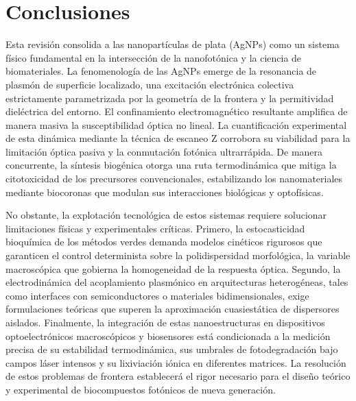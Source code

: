 \section{Conclusiones}

Esta revisión consolida a las nanopartículas de plata (AgNPs) como un sistema
físico fundamental en la intersección de la nanofotónica y la ciencia de
biomateriales. La fenomenología de las AgNPs emerge de la resonancia de
plasmón de superficie localizado, una excitación electrónica colectiva
estrictamente parametrizada por la geometría de la frontera y la permitividad
dieléctrica del entorno. El confinamiento electromagnético resultante amplifica
de manera masiva la susceptibilidad óptica no lineal. La cuantificación
experimental de esta dinámica mediante la técnica de escaneo Z corrobora su
viabilidad para la limitación óptica pasiva y la conmutación fotónica
ultrarrápida. De manera concurrente, la síntesis biogénica otorga una ruta
termodinámica que mitiga la citotoxicidad de los precursores convencionales,
estabilizando los nanomateriales mediante biocoronas que modulan sus
interacciones biológicas y optofísicas.

No obstante, la explotación tecnológica de estos sistemas requiere solucionar
limitaciones físicas y experimentales críticas. Primero, la estocasticidad
bioquímica de los métodos verdes demanda modelos cinéticos rigurosos que
garanticen el control determinista sobre la polidispersidad morfológica, la
variable macroscópica que gobierna la homogeneidad de la respuesta óptica.
Segundo, la electrodinámica del acoplamiento plasmónico en arquitecturas
heterogéneas, tales como interfaces con semiconductores o materiales
bidimensionales, exige formulaciones teóricas que superen la aproximación
cuasiestática de dispersores aislados. Finalmente, la integración de estas
nanoestructuras en dispositivos optoelectrónicos macroscópicos y biosensores
está condicionada a la medición precisa de su estabilidad termodinámica, sus
umbrales de fotodegradación bajo campos láser intensos y su lixiviación iónica
en diferentes matrices. La resolución de estos problemas de frontera
establecerá el rigor necesario para el diseño teórico y experimental de
biocompuestos fotónicos de nueva generación.
